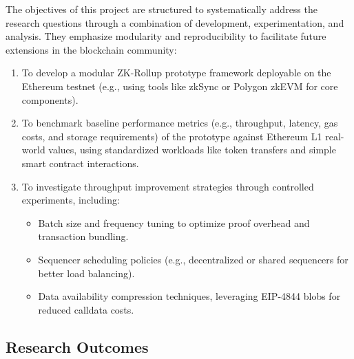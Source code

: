 The objectives of this project are structured to systematically address the research questions through a combination of development, experimentation, and analysis. They emphasize modularity and reproducibility to facilitate future extensions in the blockchain community:
\begin{enumerate}
    \item To develop a modular ZK-Rollup prototype framework deployable on the Ethereum testnet (e.g., using tools like zkSync or Polygon zkEVM for core components).
    \item To benchmark baseline performance metrics (e.g., throughput, latency, gas costs, and storage requirements) of the prototype against Ethereum L1 real-world values, using standardized workloads like token transfers and simple smart contract interactions.
    \item To investigate throughput improvement strategies through controlled experiments, including:
    \begin{itemize}
        \item Batch size and frequency tuning to optimize proof overhead and transaction bundling.
        \item Sequencer scheduling policies (e.g., decentralized or shared sequencers for better load balancing).
        \item Data availability compression techniques, leveraging EIP-4844 blobs for reduced calldata costs.
    \end{itemize}




\end{enumerate}

\vspace{12pt}
\subsection{Research Outcomes}
\vspace{12pt}

